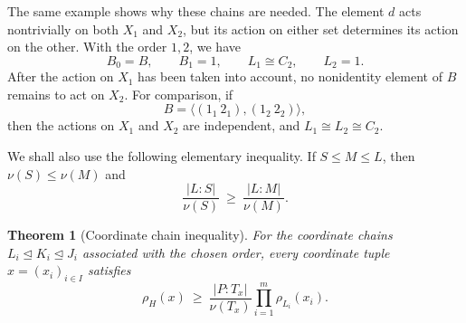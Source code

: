 \documentclass[10pt]{amsart}
\newtheorem{theorem}{Theorem}[section]
\theoremstyle{definition}
\renewcommand{\leq}{\leqslant}
\renewcommand{\geq}{\geqslant}
\numberwithin{equation}{section}
\numberwithin{table}{section}
\begin{document}
The same example shows why these chains are needed. The element $d$ acts
nontrivially on both $X_1$ and $X_2$, but its action on either set determines
its action on the other. With the order $1,2$, we have
$$
  B_0=B,\qquad B_1=1,\qquad L_1\cong C_2,\qquad L_2=1.
$$
After the action on $X_1$ has been taken into account, no nonidentity element
of $B$ remains to act on $X_2$. For comparison, if
$$
  B=\langle(1_1\ 2_1),(1_2\ 2_2)\rangle,
$$
then the actions on $X_1$ and $X_2$ are independent, and
$L_1\cong L_2\cong C_2$.

We shall also use the following elementary inequality. If
$S\leq M\leq L$, then $\nu(S)\leq\nu(M)$ and
\begin{equation}\label{eq:top-monotone}
  \frac{|L:S|}{\nu(S)}
  \ \geq\
  \frac{|L:M|}{\nu(M)}.
\end{equation}

\begin{theorem}[Coordinate chain inequality]\label{thm:coordinate}
For the coordinate chains $L_i\trianglelefteq K_i\trianglelefteq J_i$
associated with the chosen order, every coordinate tuple
$x=(x_i)_{i\in I}$ satisfies
\begin{equation}\label{eq:coord-clean}
  \rho_H(x)\ \geq\
  \frac{|P:T_x|}{\nu(T_x)}
  \prod_{i=1}^m\rho_{L_i}(x_i).
\end{equation}
\end{theorem}
\end{document}
